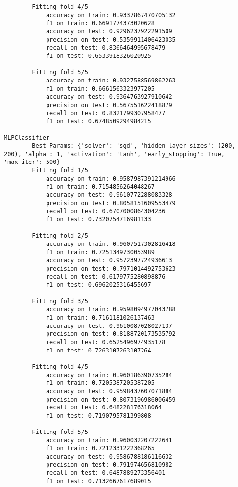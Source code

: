 \begin{verbatim}
		Fitting fold 4/5
			accuracy on train: 0.9337867470705132
			f1 on train: 0.6691774373020628
			accuracy on test: 0.9296237922291509
			precision on test: 0.5359911406423035
			recall on test: 0.8366464995678479
			f1 on test: 0.6533918326020925

		Fitting fold 5/5
			accuracy on train: 0.9327588569862263
			f1 on train: 0.6661563323977205
			accuracy on test: 0.9364763927910642
			precision on test: 0.567551622418879
			recall on test: 0.8321799307958477
			f1 on test: 0.6748509294984215

MLPClassifier
		Best Params: {'solver': 'sgd', 'hidden_layer_sizes': (200, 200), 'alpha': 1, 'activation': 'tanh', 'early_stopping': True, 'max_iter': 500}
		Fitting fold 1/5
			accuracy on train: 0.9587987391214966
			f1 on train: 0.7154856264048267
			accuracy on test: 0.9610772288083328
			precision on test: 0.8058151609553479
			recall on test: 0.6707000864304236
			f1 on test: 0.7320754716981133

		Fitting fold 2/5
			accuracy on train: 0.9607517302816418
			f1 on train: 0.7251349730053989
			accuracy on test: 0.9572397724936613
			precision on test: 0.7971014492753623
			recall on test: 0.6179775280898876
			f1 on test: 0.6962025316455697

		Fitting fold 3/5
			accuracy on train: 0.9598094977043788
			f1 on train: 0.7161181026137463
			accuracy on test: 0.9610087028027137
			precision on test: 0.8188720173535792
			recall on test: 0.6525496974935178
			f1 on test: 0.7263107263107264

		Fitting fold 4/5
			accuracy on train: 0.960186390735284
			f1 on train: 0.7205387205387205
			accuracy on test: 0.9598437607071884
			precision on test: 0.8073196986006459
			recall on test: 0.648228176318064
			f1 on test: 0.7190795781399808

		Fitting fold 5/5
			accuracy on train: 0.960032207222641
			f1 on train: 0.7212331222368265
			accuracy on test: 0.9586788186116632
			precision on test: 0.791974656810982
			recall on test: 0.6487889273356401
			f1 on test: 0.7132667617689015
\end{verbatim}
